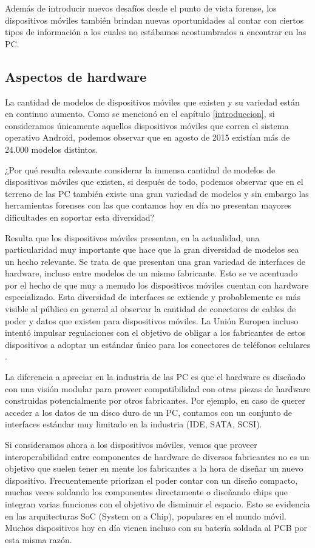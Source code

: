Además de introducir nuevos desafíos desde el punto de vista forense, los dispositivos móviles también brindan nuevas oportunidades al contar con ciertos tipos de información a los cuales no estábamos acostumbrados a encontrar en las PC.

\subsection{Aspectos de hardware}
La cantidad de modelos de dispositivos móviles que existen y su variedad están en continuo aumento. Como se mencionó en el capítulo \ref{introduccion}, si consideramos únicamente aquellos dispositivos móviles que corren el sistema operativo Android, podemos observar que en agosto de 2015 existían más de 24.000 modelos distintos.

¿Por qué resulta relevante considerar la inmensa cantidad de modelos de dispositivos móviles que existen, si después de todo, podemos observar que en el terreno de las PC también existe una gran variedad de modelos y sin embargo las herramientas forenses con las que contamos hoy en día no presentan mayores dificultades en soportar esta diversidad?

Resulta que los dispositivos móviles presentan, en la actualidad, una particularidad muy importante que hace que la gran diversidad de modelos sea un hecho relevante. Se trata de que presentan una gran variedad de interfaces de hardware, incluso entre modelos de un mismo fabricante. Esto se ve acentuado por el hecho de que muy a menudo los dispositivos móviles cuentan con hardware especializado. Esta diversidad de interfaces se extiende y probablemente es más visible al público en general al observar la cantidad de conectores de cables de poder y datos que existen para dispositivos móviles. La Unión Europea incluso intentó impulsar regulaciones con el objetivo de obligar a los fabricantes de estos dispositivos a adoptar un estándar único para los conectores de teléfonos celulares \cite{iphoneChargeConn}.

La diferencia a apreciar en la industria de las PC es que el hardware es diseñado con una visión modular para proveer compatibilidad con otras piezas de hardware construidas potencialmente por otros fabricantes. Por ejemplo, en caso de querer acceder a los datos de un disco duro de un PC, contamos con un conjunto de interfaces estándar muy limitado en la industria (IDE, SATA, SCSI).

Si consideramos ahora a los dispositivos móviles, vemos que proveer interoperabilidad entre componentes de hardware de diversos fabricantes no es un objetivo que suelen tener en mente los fabricantes a la hora de diseñar un nuevo dispositivo. Frecuentemente priorizan el poder contar con un diseño compacto, muchas veces soldando los componentes directamente o diseñando chips que integran varias funciones con el objetivo de disminuir el espacio. Esto se evidencia en las arquitecturas SoC (System on a Chip), populares en el mundo móvil. Muchos dispositivos hoy en día vienen incluso con su batería soldada al PCB por esta misma razón.

